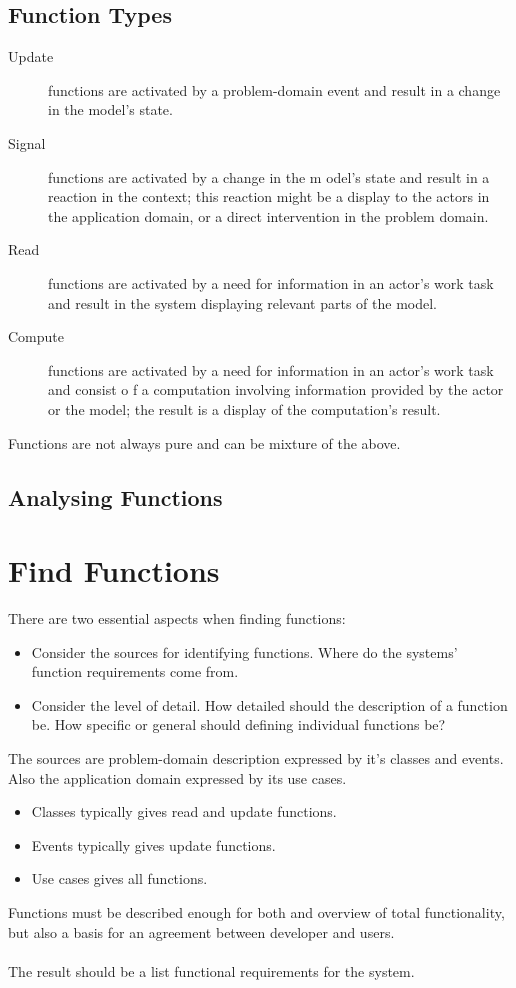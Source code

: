\subsection*{Function Types\ooad[140]}
\begin{description}
    \item[Update] functions are activated by a problem-domain event and result in a change in the model’s state.
    \item[Signal] functions are activated by a change in the m odel’s state and result in a reaction in the context; this reaction might be a display to the actors in the application domain, or a direct intervention in the problem domain.
    \item[Read] functions are activated by a need for information in an actor’s work task and result in the system displaying relevant parts of the model.
    \item[Compute] functions are activated by a need for information in an actor’s work task and consist o f a computation involving information provided by the actor or the model; the result is a display of the computation’s result.     
\end{description}
Functions are not always pure and can be mixture of the above.

\subsection*{Analysing Functions\ooad[143]}

\section{Find Functions}
There are two essential aspects when finding functions:
\begin{itemize}
    \item Consider the sources for identifying functions. Where do the systems' function requirements come from.
    \item Consider the level of detail. How detailed should the description of a function be. How specific or general should defining individual functions be?
\end{itemize}
The sources are problem-domain description expressed by it's classes and events. Also the application domain expressed by its use cases.

\begin{itemize}
    \item Classes typically gives read and update functions.
    \item Events typically gives update functions.
    \item Use cases gives all functions.
\end{itemize}
Functions must be described enough for both and overview of total functionality, but also a basis for an agreement between developer and users.\\\\
The result should be a list functional requirements for the system.

